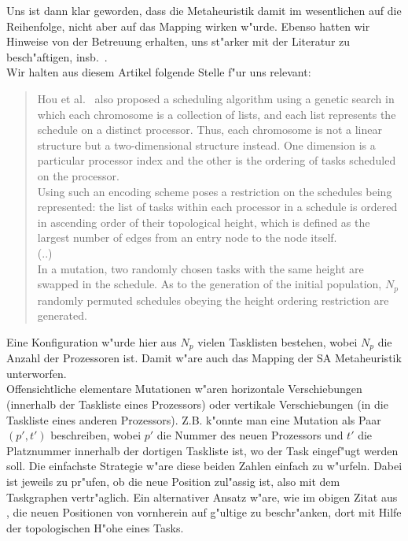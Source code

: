 \documentclass[12pt,a4paper]{article}
\begin{document}
\noindent
Uns ist dann klar geworden, dass die Metaheuristik damit
im wesentlichen auf die Reihenfolge, nicht aber auf das
Mapping wirken w"urde. Ebenso hatten wir Hinweise von der
Betreuung erhalten, uns st"arker mit der Literatur zu besch"aftigen,
insb.\ \cite{KwokAhmad1999}. \\

\noindent
Wir halten aus diesem Artikel folgende Stelle f"ur uns relevant:
\begin{quote}
Hou et al.\ \cite{Hou1994} also proposed a
scheduling algorithm using a genetic
search in which each chromosome is a
collection of lists, and each list represents
the schedule on a distinct processor.
Thus, each chromosome is not a
linear structure but a two-dimensional
structure instead. One dimension is a
particular processor index and the other
is the ordering of tasks scheduled on the
processor. \\ 
Using such an encoding
scheme poses a restriction on the schedules
being represented: the list of tasks
within each processor in a schedule is
ordered in ascending order of their topological
height, which is defined as the
largest number of edges from an entry
node to the node itself. \\
(..) \\
In a mutation, two
randomly chosen tasks with the same
height are swapped in the schedule. As
to the generation of the initial population,
$N_p$ randomly permuted schedules
obeying the height ordering restriction
are generated.
\end{quote}
Eine Konfiguration w"urde hier aus $N_p$ vielen Tasklisten
bestehen, wobei $N_p$ die Anzahl der Prozessoren ist.
Damit w"are auch das Mapping der SA Metaheuristik unterworfen. \\

\noindent 
Offensichtliche elementare Mutationen w"aren horizontale Verschiebungen
(innerhalb der Taskliste eines Prozessors) oder vertikale Verschiebungen
(in die Taskliste eines anderen Prozessors). 
Z.B. k"onnte man eine Mutation als Paar $(p', t')$ beschreiben, wobei $p'$
die Nummer des neuen Prozessors und $t'$ die Platznummer innerhalb
der dortigen Taskliste ist, wo der Task eingef"ugt werden soll. 
Die einfachste Strategie w"are diese beiden Zahlen einfach zu w"urfeln.
Dabei ist jeweils zu pr"ufen, ob die neue Position zul"assig ist, also 
mit dem Taskgraphen vertr"aglich. Ein alternativer Ansatz
w"are, wie im obigen Zitat aus \cite{Hou1994}, die neuen Positionen von
vornherein auf g"ultige zu beschr"anken, dort mit Hilfe der topologischen
H"ohe eines Tasks. \\
\end{document}
